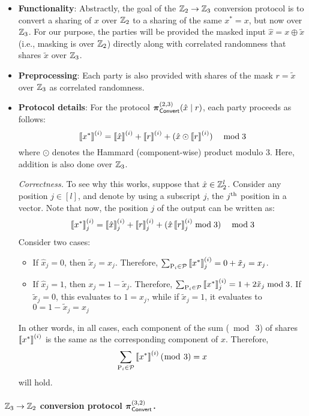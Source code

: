 \begin{itemize}
  \item \textbf{Functionality}: Abstractly, the goal of the $\mathbb{Z}_2 \to \mathbb{Z}_3$ conversion protocol is to convert a sharing of $x$ over $\mathbb{Z}_2$ to a sharing of the same $x^* = x$, but now over $\mathbb{Z}_3$. For our purpose, the parties will be provided the masked input $\hat{x} = x \oplus \tilde{x}$ (i.e., masking is over $\mathbb{Z}_2$) directly along with correlated randomness that shares $\tilde{x}$ over $\mathbb{Z}_3$.

  \item \textbf{Preprocessing}: Each party is also provided with shares of the mask $r = \tilde{x}$ over $\mathbb{Z}_3$ as correlated randomness.

  \item \textbf{Protocol details}: For the protocol $\boldsymbol{\pi}_{\textnormal{\textsf{Convert}}}^{(2,3)}(\hat{x} \mid r)$, each party proceeds as follows:
  \[
  \left\llbracket x^* \right\rrbracket^{(i)} = \left\llbracket \hat{x} \right\rrbracket^{(i)} + \left\llbracket r \right\rrbracket^{(i)} + (\hat{x} \odot \left\llbracket r \right\rrbracket^{(i)}) \quad \bmod 3
  \]
where $\odot$ denotes the Hammard (component-wise) product modulo 3. Here, addition is also done over $\mathbb{Z}_3$.

\noindent \textit{Correctness.} To see why this works, suppose that $\hat{x} \in \mathbb{Z}_2^l$. Consider any position $j \in [l]$, and denote by using a subscript $j$, the $j^{\textnormal{th}}$ position in a vector. Note that now, the position $j$ of the output can be written as:
\[
    \left\llbracket x^* \right\rrbracket^{(i)}_j = \left\llbracket \hat{x} \right\rrbracket^{(i)}_j + \left\llbracket r \right\rrbracket^{(i)}_j + (\hat{x}\left\llbracket r \right\rrbracket^{(i)}_j\bmod 3) \quad \bmod 3
\]
Consider two cases:
\begin{itemize}
\item If $\hat{x}_j = 0$, then $\tilde{x}_j = x_j$. Therefore, $\sum_{\textnormal{P}_i \in \mathcal{P}} \left\llbracket x^* \right\rrbracket^{(i)}_j = 0 + \tilde{x}_j = x_j$.

\item If $\hat{x}_j = 1$, then $x_j = 1 - \tilde{x}_j$. Therefore, $\sum_{\textnormal{P}_i \in \mathcal{P}} \left\llbracket x^* \right\rrbracket^{(i)}_j = 1 + 2\tilde{x}_j \bmod 3$. If $\tilde{x}_j = 0$, this evaluates to $1 = x_j$, while if $\tilde{x}_j = 1$, it evaluates to $0 = 1 - \tilde{x}_j = x_j$
\end{itemize}
In other words, in all cases, each component of the sum ($\bmod~3$) of shares $\left\llbracket x^* \right\rrbracket^{(i)}$ is the same as the corresponding component of $x$. Therefore, 
\[
\sum_{\textnormal{P}_i \in \mathcal{P}} \left\llbracket x^* \right\rrbracket^{(i)} (\bmod~3) = x
\]
will hold.
\end{itemize}


\paragraph{$\mathbb{Z}_3 \to \mathbb{Z}_2$ conversion protocol $\boldsymbol{\pi}_{\textnormal{\textsf{Convert}}}^{(3,2)}$.}

